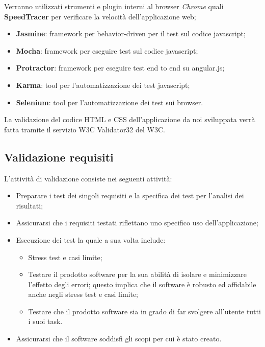 {	
	Verranno utilizzati strumenti e plugin interni al browser \emph{Chrome} quali \textbf{SpeedTracer} per verificare la velocità dell'applicazione web;
	
	\begin{itemize}
	\label{sec:strumentiTest}
    \item \textbf{Jasmine}: framework per behavior-driven per il test sul codice javascript;
	\item \textbf{Mocha}: framework per eseguire test sul codice javascript;
	\item \textbf{Protractor}: framework per eseguire test end to end su angular.js;
	\item \textbf{Karma}: tool per l'automatizzazione dei test javascript;
	\item \textbf{Selenium}: tool per l'automatizzazione dei test sui browser.
   \end{itemize}
	
	
	La validazione del codice HTML e CSS dell’applicazione da noi sviluppata verrà
	fatta tramite il servizio W3C Validator32 del W3C.

		\subsection{Validazione requisiti}
		L'attività di validazione consiste nei seguenti attività:
		\begin{itemize}
		\item Preparare i test dei singoli requisiti e la specifica dei test per l'analisi dei risultati;
		\item Assicurarsi che i requisiti testati riflettano uno specifico uso dell'applicazione;
		\item Esecuzione dei test la quale a sua volta include:
			\begin{itemize}
				\item Stress test e casi limite;
				\item Testare il prodotto software per la sua abilità di isolare e minimizzare l'effetto degli errori; questo implica che il software è robusto ed affidabile anche negli stress test e casi limite;
				\item Testare che il prodotto software sia in grado di far svolgere all'utente tutti i suoi task.
			\end{itemize}
		\item Assicurarsi che il software soddisfi gli scopi per cui è stato creato.
		\end{itemize}		
}

